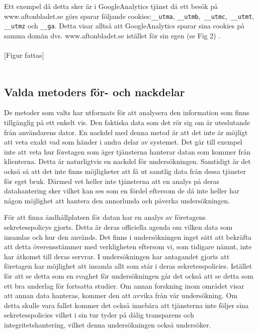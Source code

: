 \documentclass[a4paper,11pt]{article}
\begin{document}
{Ett exempel då detta sker är i GoogleAnalytics tjänst då ett besök på www.aftonbladet.se görs sparar följande cookies:\verb|__utma|, \verb|__utmb|,\verb| __utmc|,\verb| __utmt|,\verb| __utmz| och \verb|__ga|. Detta visar alltså att GoogleAnalytics sparar sina cookies på samma domän dvs. www.aftonbladet.se istället för sin egen (se Fig 2) \cite{GoogleAnalytics}.  \\\\

[Figur fattas] \\\\

\subsection{Valda metoders för- och nackdelar}
De metoder som valts har utformats för att analysera den information som finns tillgänglig på ett enkelt vis. Den faktiska data som det rör sig om är uteslutande från användarens dator. En nackdel med denna metod är att det inte är möjligt att veta exakt vad som händer i andra delar av systemet. Det går till exempel inte att veta hur företagen som äger tjänsterna hanterar datan som kommer från klienterna. Detta är naturligtvis en nackdel för undersökningen. Samtidigt är det också så att det inte finns möjligheter att få ut samtlig data från dessa tjänster för eget bruk. Därmed vet heller inte tjänsterna att en analys på deras datahantering sker vilket kan ses som en fördel eftersom de då inte heller har någon möjlighet att hantera den annorlunda och påverka undersökningen. 

För att finna ändhållplatsen för datan har en analys av företagens sekretesspolicys gjorts. Detta är deras officiella agenda om vilken data som insamlas och hur den används. Det finns i undersökningen inget sätt att bekräfta att detta överensstämmer med verkligheten eftersom vi, som tidigare nämnt, inte har åtkomst till deras servrar. I undersökningen har antagandet gjorts att företagen har möjlighet att insamla allt som står i deras sekretesspolicies. Istället för att se detta som en svaghet för undersökningen går det också att se detta som ett bra underlag för fortsatta studier. Om annan forskning inom området visar att annan data hanteras, kommer den att avvika från vår undersökning. Om detta skulle vara fallet kommer det också innebära att tjänsterna inte följer sina sekretesspolicies vilket i sin tur tyder på dålig transparens och integritetshantering, vilket denna undersökningen också undersöker. 

}
\end{document}
